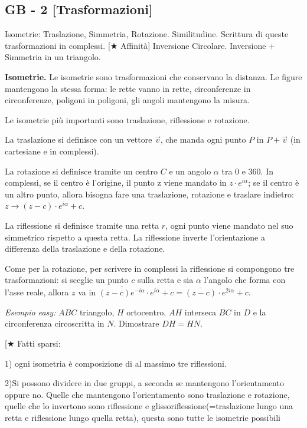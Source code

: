 \subsection{GB - 2 [Trasformazioni]}


\begin{short}
Isometrie: Traslazione, Simmetria, Rotazione. Similitudine. Scrittura di queste trasformazioni in complessi. [$\bigstar$ Affinità] 
Inversione Circolare. Inversione + Simmetria in un triangolo.
\end{short}



\vspace{0.3cm}
\textbf{Isometrie. }Le isometrie sono trasformazioni che conservano la distanza. Le figure mantengono la stessa forma: le rette vanno in rette, circonferenze in circonferenze, poligoni in poligoni, gli angoli mantengono la misura. 

Le isometrie più importanti sono traslazione, riflessione e rotazione. 

La traslazione si definisce con un vettore $\vec{v}$, che manda ogni punto $P$ in $P+\vec{v}$ (in cartesiane e in complessi).

La rotazione si definisce tramite un centro $C$ e un angolo $\alpha$ tra 0 e 360.  In complessi, se il centro è l'origine, il punto z viene mandato in $z\cdot e^{i\alpha}$; se il centro è un altro punto, allora bisogna fare una traslazione, rotazione e traslare indietro: $z\rightarrow (z-c)\cdot e^{i\alpha}+c$.

La riflessione si definisce tramite una retta $r$, ogni punto viene mandato nel suo simmetrico rispetto a questa retta. La riflessione inverte l'orientazione a differenza della traslazione e della rotazione.

Come per la rotazione, per scrivere in complessi la riflessione si compongono tre trasformazioni: si sceglie un punto $c$ sulla retta e sia $\alpha$ l'angolo che forma con l'asse reale, allora $z$ va in $\overline{(z-c)e^{-i\alpha}}\cdot e^{i\alpha}+c=\overline{(z-c)}\cdot e^{2i\alpha}+c$.

\textit{Esempio easy:}  $ABC$ triangolo, $H$ ortocentro, $AH$ interseca $BC$ in $D$ e la circonferenza circoscritta in $N$. Dimostrare $DH=HN$.

\vspace{0.3cm}
[$\bigstar$ Fatti sparsi: 

1) ogni isometria è composizione di al massimo tre riflessioni.

2)Si possono dividere in due gruppi, a seconda se mantengono l'orientamento oppure no. Quelle che mantengono l'orientamento sono traslazione e rotazione, quelle che lo invertono sono riflessione e glissoriflessione(=traslazione lungo una retta e riflessione lungo quella retta), questa sono tutte le isometrie possibili

